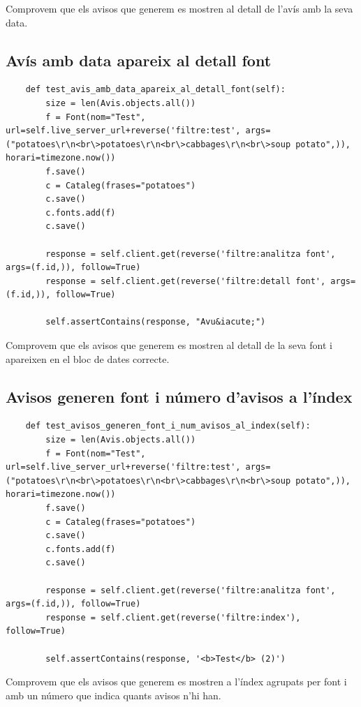 \documentclass{article}
\begin{document}
Comprovem que els avisos que generem es mostren al detall de l'avís amb la seva data.

\subsection{Avís amb data apareix al detall font}

\begin{lstlisting}
    def test_avis_amb_data_apareix_al_detall_font(self):
        size = len(Avis.objects.all())
        f = Font(nom="Test", url=self.live_server_url+reverse('filtre:test', args=("potatoes\r\n<br\>potatoes\r\n<br\>cabbages\r\n<br\>soup potato",)), horari=timezone.now())
        f.save()
        c = Cataleg(frases="potatoes")
        c.save()
        c.fonts.add(f)
        c.save()

        response = self.client.get(reverse('filtre:analitza font', args=(f.id,)), follow=True)
        response = self.client.get(reverse('filtre:detall font', args=(f.id,)), follow=True)

        self.assertContains(response, "Avu&iacute;")
\end{lstlisting}

Comprovem que els avisos que generem es mostren al detall de la seva font i apareixen en el bloc de dates correcte.

\subsection{Avisos generen font i número d'avisos a l'índex}

\begin{lstlisting}
    def test_avisos_generen_font_i_num_avisos_al_index(self):
        size = len(Avis.objects.all())
        f = Font(nom="Test", url=self.live_server_url+reverse('filtre:test', args=("potatoes\r\n<br\>potatoes\r\n<br\>cabbages\r\n<br\>soup potato",)), horari=timezone.now())
        f.save()
        c = Cataleg(frases="potatoes")
        c.save()
        c.fonts.add(f)
        c.save()

        response = self.client.get(reverse('filtre:analitza font', args=(f.id,)), follow=True)
        response = self.client.get(reverse('filtre:index'), follow=True)

        self.assertContains(response, '<b>Test</b> (2)')
\end{lstlisting}

Comprovem que els avisos que generem es mostren a l'índex agrupats per font i amb un número que indica quants avisos n'hi han.
\end{document}
